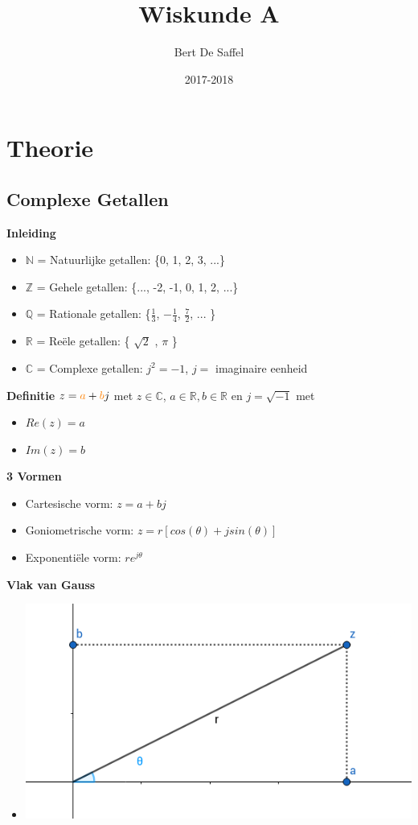 \documentclass[12pt]{report}
\title{Wiskunde A}
\author{Bert De Saffel}
\date{2017-2018}
\newcommand{\important}[1] {\textbf{\color{orange}#1}}
\newcommand{\mathimportant}[2] {\textbf{\color{#2}$#1$}}
\begin{document}
\maketitle
\tableofcontents

\part{Theorie}
\chapter{Complexe Getallen}
\important{Inleiding}
\begin{itemize}
 \item $\mathbb{N}$ = Natuurlijke getallen: \{0, 1, 2, 3, ...\}
 \item $\mathbb{Z}$ = Gehele getallen: \{..., -2, -1, 0, 1, 2, ...\}
 \item $\mathbb{Q}$ = Rationale getallen: \{$\frac{1}{3}$, $-\frac{1}{4}$, $\frac{7}{2}$, ... \}
 \item $\mathbb{R}$ = Reële getallen: \{ $\sqrt{2}$ , $\pi$ \}
 \item $\mathbb{C}$ = Complexe getallen: $j^2 = -1$, $j = $ imaginaire eenheid
\end{itemize}
\important{Definitie}
$z = \mathimportant{a}{orange} + \mathimportant{b}{orange}j$ met $z \in \mathbb{C}$, $a \in \mathbb{R}, b \in \mathbb{R}$ en $j = \sqrt{-1}$ met
\begin{itemize}
 \item $Re(z) = a$
 \item $Im(z) = b$
\end{itemize}
\important{3 Vormen}
\begin{itemize}
 \item Cartesische vorm: $z = a + bj$
 \item Goniometrische vorm: $z = r[cos(\theta) + jsin(\theta)]$
 \item Exponentiële vorm: $re^{j\theta}$
\end{itemize}
\important{Vlak van Gauss}
\begin{itemize}[label={}]
 \item \includegraphics[width=\linewidth]{goniometrischevorm}
\end{itemize}
\end{document}
